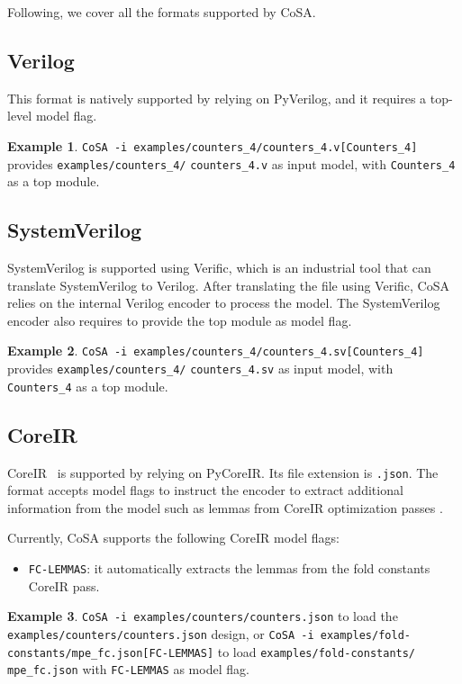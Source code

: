\documentclass{article}
\theoremstyle{definition}
\newtheorem{example}{Example}[section]
\begin{document}
Following, we cover all the formats supported by CoSA.

\subsection{Verilog}
This format is natively supported by relying on PyVerilog, and it
requires a top-level model flag.

\begin{example}
  \texttt{CoSA -i examples/counters\_4/counters\_4.v[Counters\_4]}
  provides \texttt{examples/counters\_4/} \texttt{counters\_4.v} as input model,
  with \texttt{Counters\_4} as a top module.
\end{example}

\subsection{SystemVerilog}
SystemVerilog is supported using Verific, which is an industrial tool
that can translate SystemVerilog to Verilog. After translating the
file using Verific, CoSA relies on the internal Verilog encoder to
process the model. The SystemVerilog encoder also requires to provide
the top module as model flag.

\begin{example}
  \texttt{CoSA -i examples/counters\_4/counters\_4.sv[Counters\_4]}
  provides \texttt{examples/counters\_4/} \texttt{counters\_4.sv} as input model,
  with \texttt{Counters\_4} as a top module.
\end{example}

\subsection{CoreIR}
CoreIR~\cite{CoreIR} is supported by relying on PyCoreIR. Its file
extension is \texttt{.json}. The format accepts model flags to
instruct the encoder to extract additional information from the model
such as lemmas from CoreIR optimization passes \cite{cosa-paper}.

Currently, CoSA supports the following CoreIR model flags:
\begin{itemize}
\item \texttt{FC-LEMMAS}: it automatically extracts the lemmas from
  the fold constants CoreIR pass.
\end{itemize}

\begin{example}
  \texttt{CoSA -i examples/counters/counters.json} to load the
  \texttt{examples/counters/counters.json} design, or \texttt{CoSA -i
    examples/fold-constants/mpe\_fc.json[FC-LEMMAS]} to load
  \texttt{examples/fold-constants/} \texttt{mpe\_fc.json} with
  \texttt{FC-LEMMAS} as model flag.
\end{example}
\end{document}
